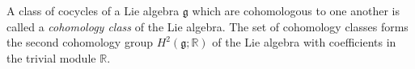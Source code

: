 A class of cocycles of a Lie algebra $\mathfrak{g}$ which are cohomologous to one another is called a \textit{cohomology class} of the Lie algebra. The set of cohomology classes forms the second cohomology group $H^2(\mathfrak{g}; \mathbb{R})$ of the Lie algebra with coefficients in the trivial module $\mathbb{R}$.

